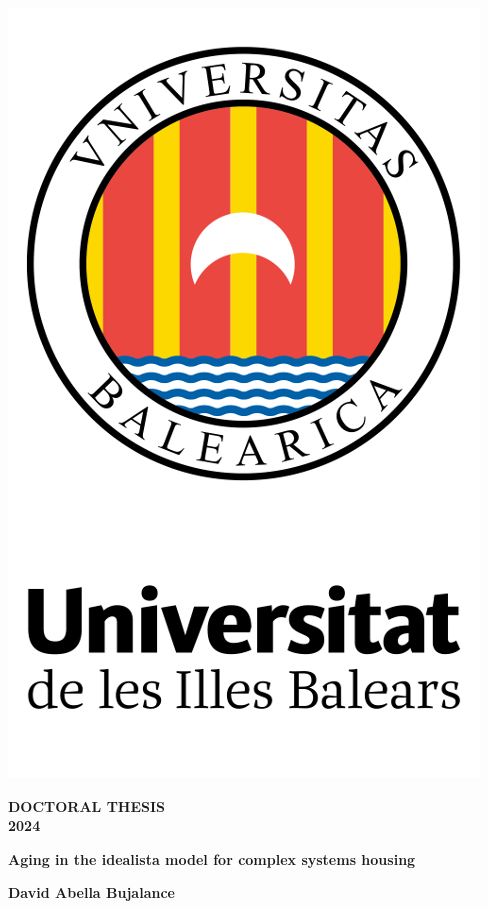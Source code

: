 \begin{titlepage}
    	\large

        \begin{center}
            \sffamily
            \includegraphics[width=.35\textwidth]{Figs/uib.png}
        
            \vspace*{.05\textheight}

			{\Huge\bfseries DOCTORAL THESIS} \\
			{\Large \bfseries 2024}

            \vspace*{.15\textheight}

			\begingroup
				{\Huge\bfseries Aging in the idealista model for complex systems housing \par}
			\endgroup

            \vfill

            {\Large \bfseries David Abella Bujalance}
        \end{center}
\end{titlepage}